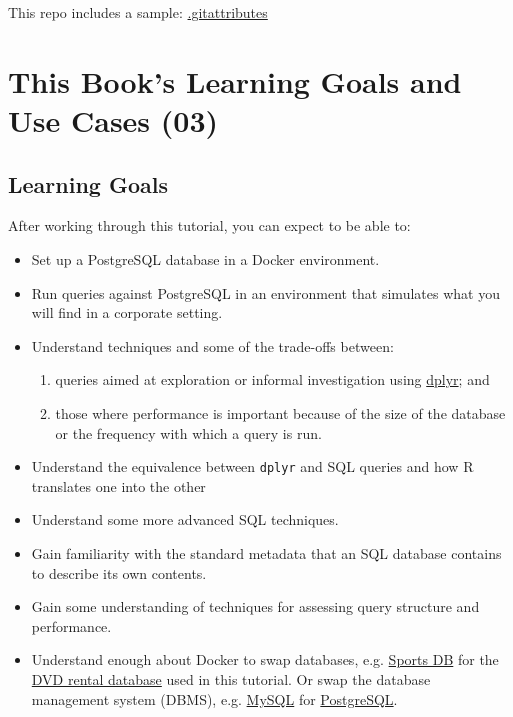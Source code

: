 \documentclass[]{book}
\providecommand{\tightlist}{%
  \setlength{\itemsep}{0pt}\setlength{\parskip}{0pt}}
\theoremstyle{definition}
\theoremstyle{definition}
\theoremstyle{definition}
\theoremstyle{remark}
\begin{document}
This repo includes a sample:
\href{https://github.com/smithjd/sql-pet/blob/master/.gitattributes}{.gitattributes}

\hypertarget{this-books-learning-goals-and-use-cases-03}{%
\chapter{This Book's Learning Goals and Use Cases
(03)}\label{this-books-learning-goals-and-use-cases-03}}

\hypertarget{learning-goals}{%
\section{Learning Goals}\label{learning-goals}}

After working through this tutorial, you can expect to be able to:

\begin{itemize}
\tightlist
\item
  Set up a PostgreSQL database in a Docker environment.
\item
  Run queries against PostgreSQL in an environment that simulates what
  you will find in a corporate setting.
\item
  Understand techniques and some of the trade-offs between:

  \begin{enumerate}
  \def\labelenumi{\arabic{enumi}.}
  \tightlist
  \item
    queries aimed at exploration or informal investigation using
    \href{https://cran.r-project.org/package=dplyr}{dplyr}; and
  \item
    those where performance is important because of the size of the
    database or the frequency with which a query is run.
  \end{enumerate}
\item
  Understand the equivalence between \texttt{dplyr} and SQL queries and
  how R translates one into the other
\item
  Understand some more advanced SQL techniques.
\item
  Gain familiarity with the standard metadata that an SQL database
  contains to describe its own contents.
\item
  Gain some understanding of techniques for assessing query structure
  and performance.
\item
  Understand enough about Docker to swap databases, e.g.
  \href{http://www.sportsdb.org/sd/samples}{Sports DB} for the
  \href{http://www.postgresqltutorial.com/postgresql-sample-database/}{DVD
  rental database} used in this tutorial. Or swap the database
  management system (DBMS), e.g. \href{https://www.mysql.com/}{MySQL}
  for \href{https://www.postgresql.org/}{PostgreSQL}.
\end{itemize}
\end{document}
